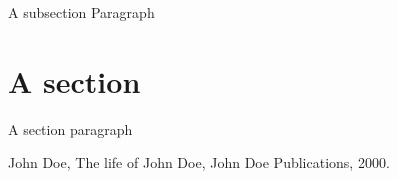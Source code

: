 \documentclass[12pt,a4paper,oneside]{book}
\renewcommand{\headrulewidth}{0pt}
\renewcommand{\headrulewidth}{0pt}
\begin{document}
\indent A subsection Paragraph

\section*{A section}

\indent A section paragraph





\begin{thebibliography}{0}
\renewcommand{\headrulewidth}{0pt}
\fancyhead{}
\markboth{}{}{}

John Doe, The life of John Doe, John Doe Publications, 2000.

\end{thebibliography}
\pagebreak\centering\setlength{\parindent}{10pt}
\tableofcontents
{}
\end{document}
